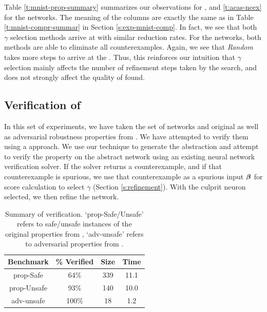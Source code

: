 Table \ref{t:mnist-prop-summary} summarizes our observations for \mnist, and
\ref{t:acas-ncex} for the \acasxu networks. The meaning of the columns are
exactly the same as in Table \ref{t:mnist-compr-summar} in Section
\ref{s:exp-mnist-comp}. In fact, we see that both $\gamma$ selection methods
arrive at \abs with similar reduction rates. For the \mnist networks, both
methods are able to eliminate all counterexamples.  Again, we see that
\textit{Random} takes more steps to arrive at the \abs. Thus, this reinforces
our intuition that $\gamma$ selection mainly affects the number of refinement
steps taken by the search, and does not strongly affect the quality of \abs
found.

\subsection{Verification of \acasxu}
\label{s:acas-verif}

In this set of experiments, we have taken the \acasxu set of
networks and original as well as adversarial robustness properties from
\cite{reluplex,cegar-nn}. We have attempted to verify them using a \cegar
approach. We
use our technique to generate the abstraction and attempt to verify the
property on the abstract network using an existing neural network verification
solver. If the solver returns a counterexample, and if that counterexample is
spurious, we use that counterexample as a spurious input $\boldsymbol{\beta}$ for score
calculation to select $\gamma$ (Section \ref{s:refinement}). With the culprit
neuron selected, we then refine the network.

\begin{table}
\begin{tabular}{ |c|c|c|c| }
\hline
Benchmark   & \% Verified & Size     & Time \\ 
\hline
prop-Safe   &   64\%      & 339      & 11.1  \\
prop-Unsafe &   93\%      & 140      & 10.0  \\
adv-unsafe  &  100\%      & 18       & 1.2   \\
\hline                                                                
\end{tabular}
\caption{Summary of \acasxu verification. `prop-Safe/Unsafe' refers to
safe/unsafe instances of the original properties from \cite{reluplex},
`adv-unsafe' refers to adversarial properties from \cite{cegar-nn}. }
\label{t:acas-verif}
\end{table}

